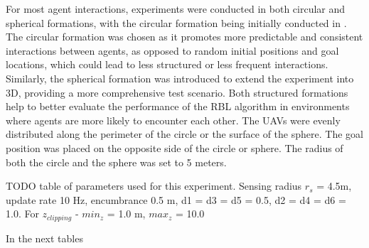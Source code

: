         For most agent interactions, experiments were conducted in both circular and spherical formations, with the circular formation being initially conducted in \cite{rbl_paper}. 
        The circular formation was chosen as it promotes more predictable and consistent interactions between agents, as opposed to random initial positions and goal locations, which could lead to less structured or less frequent interactions. 
        Similarly, the spherical formation was introduced to extend the experiment into 3D, providing a more comprehensive test scenario. 
        Both structured formations help to better evaluate the performance of the RBL algorithm in environments where agents are more likely to encounter each other.
        The \ac{UAV}s were evenly distributed along the perimeter of the circle or the surface of the sphere. 
        The goal position was placed on the opposite side of the circle or sphere. 
        The radius of both the circle and the sphere was set to 5 meters.
        
        TODO table of parameters used for this experiment.
        Sensing radius $r_s$ = 4.5m, update rate 10 Hz, encumbrance 0.5 m, d1 = d3 = d5 = 0.5, d2 = d4 = d6 = 1.0.
        For $z_{clipping}$ - $min_z$ = 1.0 m, $max_z$ = 10.0


        In the next tables 
        
